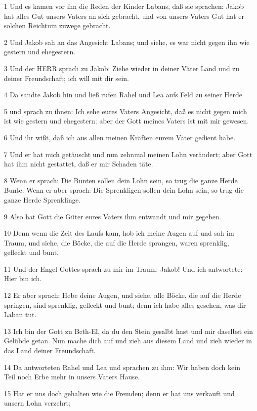 \par 1 Und es kamen vor ihn die Reden der Kinder Labans, daß sie sprachen: Jakob hat alles Gut unsers Vaters an sich gebracht, und von unsers Vaters Gut hat er solchen Reichtum zuwege gebracht.
\par 2 Und Jakob sah an das Angesicht Labans; und siehe, es war nicht gegen ihn wie gestern und ehegestern.
\par 3 Und der HERR sprach zu Jakob: Ziehe wieder in deiner Väter Land und zu deiner Freundschaft; ich will mit dir sein.
\par 4 Da sandte Jakob hin und ließ rufen Rahel und Lea aufs Feld zu seiner Herde
\par 5 und sprach zu ihnen: Ich sehe eures Vaters Angesicht, daß es nicht gegen mich ist wie gestern und ehegestern; aber der Gott meines Vaters ist mit mir gewesen.
\par 6 Und ihr wißt, daß ich aus allen meinen Kräften eurem Vater gedient habe.
\par 7 Und er hat mich getäuscht und nun zehnmal meinen Lohn verändert; aber Gott hat ihm nicht gestattet, daß er mir Schaden täte.
\par 8 Wenn er sprach: Die Bunten sollen dein Lohn sein, so trug die ganze Herde Bunte. Wenn er aber sprach: Die Sprenkligen sollen dein Lohn sein, so trug die ganze Herde Sprenklinge.
\par 9 Also hat Gott die Güter eures Vaters ihm entwandt und mir gegeben.
\par 10 Denn wenn die Zeit des Laufs kam, hob ich meine Augen auf und sah im Traum, und siehe, die Böcke, die auf die Herde sprangen, waren sprenklig, gefleckt und bunt.
\par 11 Und der Engel Gottes sprach zu mir im Traum: Jakob! Und ich antwortete: Hier bin ich.
\par 12 Er aber sprach: Hebe deine Augen, und siehe, alle Böcke, die auf die Herde springen, sind sprenklig, gefleckt und bunt; denn ich habe alles gesehen, was dir Laban tut.
\par 13 Ich bin der Gott zu Beth-El, da du den Stein gesalbt hast und mir daselbst ein Gelübde getan. Nun mache dich auf und zieh aus diesem Land und zieh wieder in das Land deiner Freundschaft.
\par 14 Da antworteten Rahel und Lea und sprachen zu ihm: Wir haben doch kein Teil noch Erbe mehr in unsers Vaters Hause.
\par 15 Hat er uns doch gehalten wie die Fremden; denn er hat uns verkauft und unsern Lohn verzehrt;
